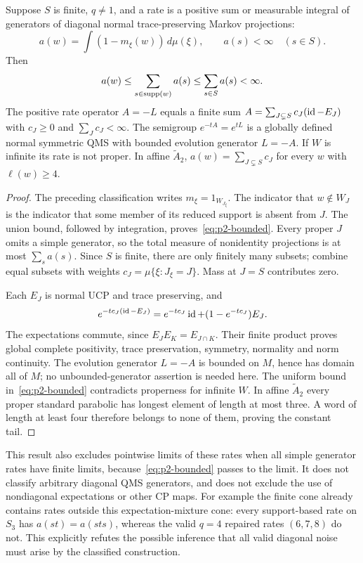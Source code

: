 \begin{theorem}\label{thm:p2-affine}
Suppose $S$ is finite, $q\ne1$, and a rate is a positive sum or measurable
integral of generators of diagonal normal trace-preserving Markov
projections:
\[
 a(w)=\int(1-m_\xi(w))\,d\mu(\xi),\qquad a(s)<\infty\quad(s\in S).
\]
Then
\begin{equation}\label{eq:p2-bounded}
 a(w)\leq\sum_{s\in\operatorname{supp}(w)}a(s)\leq\sum_{s\in S}a(s)<\infty.
\end{equation}
The positive rate operator $A=-L$ equals a finite sum
$A=\sum_{J\subsetneq S}c_J(\operatorname{id}-E_J)$ with $c_J\geq0$ and
$\sum_Jc_J<\infty$. The semigroup $e^{-tA}=e^{tL}$ is a globally defined
normal symmetric QMS with bounded evolution generator $L=-A$.
If $W$ is infinite its rate is not proper.
In affine $\widetilde A_2$, $a(w)=\sum_{J\subsetneq S}c_J$ for every
$w$ with $\ell(w)\geq4$.
\end{theorem}
\begin{proof}
The preceding classification writes $m_\xi=1_{W_{J_\xi}}$.
The indicator that $w\notin W_J$ is the indicator that some member
of its reduced support is absent from $J$. The union bound, followed
by integration, proves~\eqref{eq:p2-bounded}.
Every proper $J$ omits a simple generator, so the total measure of
nonidentity projections is at most $\sum_sa(s)$. Since $S$ is finite,
there are only finitely many subsets; combine equal subsets with weights
$c_J=\mu\{\xi:J_\xi=J\}$. Mass at $J=S$ contributes zero.

Each $E_J$ is normal UCP and trace preserving, and
\[
 e^{-tc_J(\operatorname{id}-E_J)}=e^{-tc_J}\operatorname{id}+(1-e^{-tc_J})E_J.
\]
The expectations commute, since $E_JE_K=E_{J\cap K}$. Their finite
product proves global complete positivity, trace preservation, symmetry,
normality and norm continuity. The evolution generator $L=-A$ is bounded on $M$, hence
has domain all of $M$; no unbounded-generator assertion is needed here.
The uniform bound in~\eqref{eq:p2-bounded} contradicts properness for
infinite $W$. In affine $\widetilde A_2$ every proper standard parabolic
has longest element of length at most three. A word of length at least
four therefore belongs to none of them, proving the constant tail.
\end{proof}

This result also excludes pointwise limits of these rates when all simple
generator rates have finite limits, because~\eqref{eq:p2-bounded} passes
to the limit. It does not classify arbitrary diagonal QMS generators,
and does not exclude the use of nondiagonal expectations or other CP maps.
For example the finite cone already contains rates outside this
expectation-mixture cone: every support-based rate on $S_3$ has
$a(st)=a(sts)$, whereas the valid $q=4$ repaired rates $(6,7,8)$ do not.
This explicitly refutes the possible inference that all valid diagonal
noise must arise by the classified construction.

